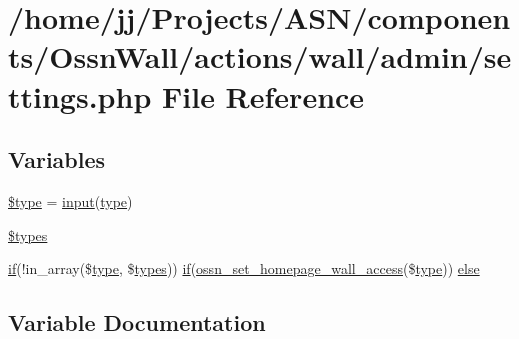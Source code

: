 \hypertarget{components_2_ossn_wall_2actions_2wall_2admin_2settings_8php}{}\section{/home/jj/\+Projects/\+A\+S\+N/components/\+Ossn\+Wall/actions/wall/admin/settings.php File Reference}
\label{components_2_ossn_wall_2actions_2wall_2admin_2settings_8php}
\subsection*{Variables}
\begin{DoxyCompactItemize}
\item 
\hyperlink{components_2_ossn_wall_2actions_2wall_2admin_2settings_8php_a9a4a6fba2208984cabb3afacadf33919}{\$type} = \hyperlink{ossn_8lib_8input_8php_a64ebee98b041c4f75f71ed3cd73cc8ed}{input}(\textquotesingle{}\hyperlink{_ossn_wall_2actions_2wall_2post_2group_8php_a2dc1bb4e1ed0029daa81ac0776b14b51}{type}\textquotesingle{})
\item 
\hyperlink{components_2_ossn_wall_2actions_2wall_2admin_2settings_8php_a92d70a97331cc6fc0a79d9da50895be8}{\$types}
\item 
\hyperlink{jquery_8tokeninput_8js_ad8dd46a3cbc004569e34401e9e71771a}{if}(!in\+\_\+array(\$\hyperlink{_ossn_wall_2actions_2wall_2post_2group_8php_a2dc1bb4e1ed0029daa81ac0776b14b51}{type}, \$\hyperlink{_chart_8_core_8js_a0ecd014dd4c5d61d8130961daf1eed54}{types})) \hyperlink{jquery_8tokeninput_8js_ad8dd46a3cbc004569e34401e9e71771a}{if}(\hyperlink{_ossn_wall_2ossn__com_8php_a31de08b753872350ff56d81d50fb89c1}{ossn\+\_\+set\+\_\+homepage\+\_\+wall\+\_\+access}(\$\hyperlink{_ossn_wall_2actions_2wall_2post_2group_8php_a2dc1bb4e1ed0029daa81ac0776b14b51}{type})) \hyperlink{components_2_ossn_wall_2actions_2wall_2admin_2settings_8php_a448512a6dada4cd8e4918585968bf038}{else}
\end{DoxyCompactItemize}


\subsection{Variable Documentation}
